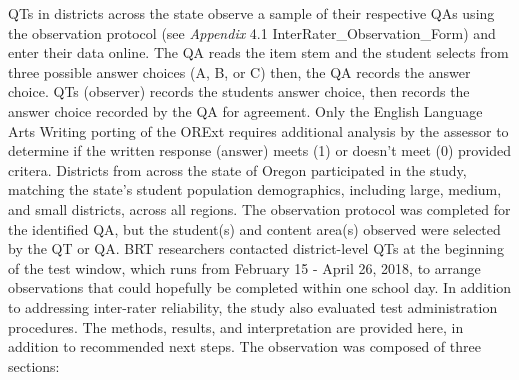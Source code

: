 \documentclass[]{article}
\begin{document}
QTs in districts across the state observe a sample of their respective
QAs using the observation protocol (see \emph{Appendix} 4.1
InterRater\_Observation\_Form) and enter their data online. The QA reads
the item stem and the student selects from three possible answer choices
(A, B, or C) then, the QA records the answer choice. QTs (observer)
records the students answer choice, then records the answer choice
recorded by the QA for agreement. Only the English Language Arts Writing
porting of the ORExt requires additional analysis by the assessor to
determine if the written response (answer) meets (1) or doesn't meet (0)
provided critera. Districts from across the state of Oregon participated
in the study, matching the state's student population demographics,
including large, medium, and small districts, across all regions. The
observation protocol was completed for the identified QA, but the
student(s) and content area(s) observed were selected by the QT or QA.
BRT researchers contacted district-level QTs at the beginning of the
test window, which runs from February 15 - April 26, 2018, to arrange
observations that could hopefully be completed within one school day. In
addition to addressing inter-rater reliability, the study also evaluated
test administration procedures. The methods, results, and interpretation
are provided here, in addition to recommended next steps. The
observation was composed of three sections:
\end{document}
